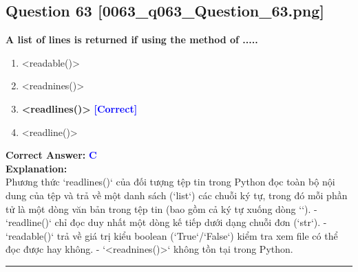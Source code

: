 \documentclass[11pt,a4paper]{article}
\begin{document}
\begin{minipage}{\textwidth}
\subsection*{Question 63 \quad \footnotesize{[0063_q063_Question_63.png]}}
\noindent \textbf{A list of lines is returned if using the method of .....}

\begin{enumerate}[label=\Alph*.]
    \item <readable()>
    \item <readnines()>
    \item \textbf{<readlines()>} \hfill \textcolor{blue}{\textbf{[Correct]}}
    \item <readline()>
\end{enumerate}

\noindent \textbf{Correct Answer:} \textcolor{blue}{\textbf{C}} \\[4pt]
\noindent \textbf{Explanation:}\\
Phương thức `readlines()` của đối tượng tệp tin trong Python đọc toàn bộ nội dung của tệp và trả về một danh sách (`list`) các chuỗi ký tự, trong đó mỗi phần tử là một dòng văn bản trong tệp tin (bao gồm cả ký tự xuống dòng `\n`).\newline
\newline
- `readline()` chỉ đọc duy nhất một dòng kế tiếp dưới dạng chuỗi đơn (`str`).\newline
- `readable()` trả về giá trị kiểu boolean (`True`/`False`) kiểm tra xem file có thể đọc được hay không.\newline
- `<readnines()>` không tồn tại trong Python.
\end{minipage}
\vspace{0.8cm}
\hrule
\vspace{0.5cm}
\end{document}
